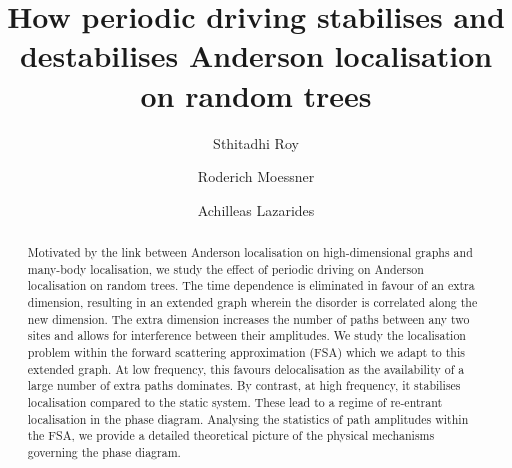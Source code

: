 \documentclass[aps,prl,twocolumn,superscriptaddress,nobalancelastpage,longbibliography]{revtex4-2}
\begin{document}
\title{
How periodic driving stabilises and destabilises Anderson localisation on random trees
}

\author{Sthitadhi Roy}
\author{Roderich Moessner}
\author{Achilleas Lazarides}



\begin{abstract}
Motivated by the link between Anderson localisation on high-dimensional graphs and many-body localisation, we study the effect of periodic driving on Anderson localisation on random trees. The time dependence is eliminated in favour of an extra dimension, resulting in an extended graph wherein the disorder is correlated along the new dimension. The extra dimension increases the number of paths between any two sites and allows for interference between their amplitudes. We study the localisation problem within the forward scattering approximation (FSA) which we adapt to this extended graph. At low frequency, this favours delocalisation as the availability of a large number of extra paths dominates. By contrast, at high frequency, it stabilises localisation compared to the static system. These lead to a regime of re-entrant localisation in the phase diagram. Analysing the statistics of path amplitudes within the FSA, we provide a detailed theoretical picture of the physical mechanisms governing the phase diagram. 
\end{abstract}





\maketitle
\end{document}

